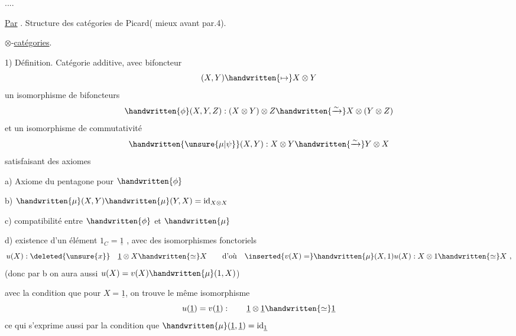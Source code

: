 ....

\uline{Par} . Structure des catégories de Picard( mieux avant par.4).





$\otimes$-\uline{catégories}.

1) Définition. Catégorie  additive, avec bifoncteur
\[
(X,Y)\handwritten{\mapsto}X\otimes Y
\]
 un  isomorphisme de bifoncteurs
\[
\handwritten{\phi}(X,Y,Z): (X\otimes Y)\otimes Z\handwritten{\xrightarrow{\sim}}X\otimes(Y\otimes Z)
\]
et un isomorphisme de commutativité
\[
\handwritten{\unsure{\mu|\psi}}(X,Y): X\otimes Y\handwritten{\xrightarrow{\sim}}Y\otimes X
\]
satisfaisant des axiomes

a) Axiome du pentagone pour $\handwritten{\phi}$ 

b) $\handwritten{\mu}(X,Y)\handwritten{\mu}(Y,X)=\mathrm{id}_{X\otimes X}$ \handwritten{;}

c) compatibilité entre $\handwritten{\phi}$ et $\handwritten{\mu}$ 

d) existence d'un élément $1_C=\underline{1}$ , avec des isomorphismes fonctoriels
\[
u(X):\deleted{\unsure{x}}\quad\underline{1}\otimes X\handwritten{\simeq}X
\qquad\text{d'où}\quad
\inserted{v(X)=}\handwritten{\mu}(X,1)u(X): X\otimes1\handwritten{\simeq}X\ ,
\]
(donc par b on aura aussi $u(X)=v(X)\handwritten{\mu}(1,X)$)

avec la condition que pour $X=\underline{1}$, on trouve le même isomorphisme
\[
u(\underline{1})=v(\underline{1}) :\qquad \underline{1}\otimes\underline{1}\handwritten{\simeq}\underline{1}
\]
ce qui s'exprime aussi par la condition que $\handwritten{\mu}(\underline{1},\underline{1})=\mathrm{id}_{\underline{1}}$ \handwritten{;}

